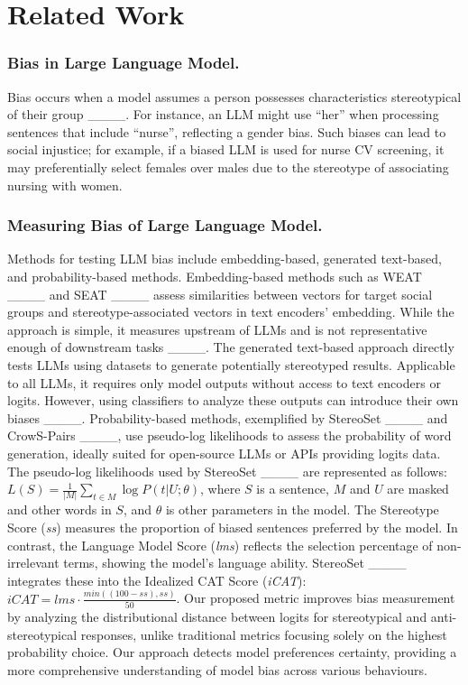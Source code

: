 \section{Related Work}
\subsubsection{{Bias in Large Language Model.}}
Bias occurs when a model assumes a person possesses characteristics stereotypical of their group ____. For instance, an LLM might use ``her'' when processing sentences that include ``nurse'', reflecting a gender bias. Such biases can lead to social injustice; for example, if a biased LLM is used for nurse CV screening, it may preferentially select females over males due to the stereotype of associating nursing with women.

\subsubsection{{Measuring Bias of Large Language Model.}}
Methods for testing LLM bias include embedding-based, generated text-based, and probability-based methods. Embedding-based methods such as WEAT ____ and SEAT ____ assess similarities between vectors for target social groups and stereotype-associated vectors in text encoders' embedding. While the approach is simple, it measures upstream of LLMs and is not representative enough of downstream tasks ____. The generated text-based approach directly tests LLMs using datasets to generate potentially stereotyped results. Applicable to all LLMs, it requires only model outputs without access to text encoders or logits. However, using classifiers to analyze these outputs can introduce their own biases ____. Probability-based methods, exemplified by StereoSet ____ and CrowS-Pairs ____, use pseudo-log likelihoods to assess the probability of word generation, ideally suited for open-source LLMs or APIs providing logits data. The pseudo-log likelihoods used by StereoSet ____ are represented as follows: $L(S)=\frac{1}{|M|}\sum_{t \in M}\log P(t|U;\theta)$\label{mlmfs}, where $S$ is a sentence, $M$ and $U$ are masked and other words in $S$, and $\theta$ is other parameters in the model. The Stereotype Score (\textit{ss}) measures the proportion of biased sentences preferred by the model. In contrast, the Language Model Score (\textit{lms}) reflects the selection percentage of non-irrelevant terms, showing the model's language ability. StereoSet ____ integrates these into the Idealized CAT Score (\textit{iCAT}): $iCAT = lms \cdot \frac{min((100 - ss), ss)}{50}$\label{icat}. Our proposed metric improves bias measurement by analyzing the distributional distance between logits for stereotypical and anti-stereotypical responses, unlike traditional metrics focusing solely on the highest probability choice. Our approach detects model preferences certainty, providing a more comprehensive understanding of model bias across various behaviours.

